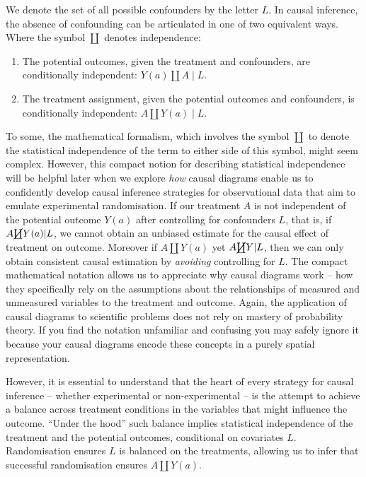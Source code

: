 \documentclass[
  singlecolumn]{article}
\providecommand{\tightlist}{%
  \setlength{\itemsep}{0pt}\setlength{\parskip}{0pt}}\usepackage{longtable,booktabs,array}
\begin{document}
We denote the set of all possible confounders by the letter \(L\). In
causal inference, the absence of confounding can be articulated in one
of two equivalent ways. Where the symbol \(\coprod\) denotes
independence:

\begin{enumerate}
\def\labelenumi{\arabic{enumi}.}
\tightlist
\item
  The potential outcomes, given the treatment and confounders, are
  conditionally independent: \(Y(a) \coprod A \mid L\).
\item
  The treatment assignment, given the potential outcomes and
  confounders, is conditionally independent: \(A \coprod Y(a) \mid L\).
\end{enumerate}

To some, the mathematical formalism, which involves the symbol
\(\coprod\) to denote the statistical independence of the term to either
side of this symbol, might seem complex. However, this compact notion
for describing statistical independence will be helpful later when we
explore \emph{how} causal diagrams enable us to confidently develop
causal inference strategies for observational data that aim to emulate
experimental randomisation. If our treatment \(A\) is not independent of
the potential outcome \(Y(a)\) after controlling for confounders \(L\),
that is, if \(A\cancel\coprod Y(a)|L\), we cannot obtain an unbiased
estimate for the causal effect of treatment on outcome. Moreover if
\(A\coprod Y(a)\) yet \(A\cancel \coprod Y|L\), then we can only obtain
consistent causal estimation by \emph{avoiding} controlling for \(L\).
The compact mathematical notation allows us to appreciate why causal
diagrams work -- how they specifically rely on the assumptions about the
relationships of measured and unmeasured variables to the treatment and
outcome. Again, the application of causal diagrams to scientific
problems does not rely on mastery of probability theory. If you find the
notation unfamiliar and confusing you may safely ignore it because your
causal diagrams encode these concepts in a purely spatial
representation.

However, it is essential to understand that the heart of every strategy
for causal inference -- whether experimental or non-experimental -- is
the attempt to achieve a balance across treatment conditions in the
variables that might influence the outcome. ``Under the hood'' such
balance implies statistical independence of the treatment and the
potential outcomes, conditional on covariates \(L\). Randomisation
ensures \(L\) is balanced on the treatments, allowing us to infer that
successful randomisation ensures \(A \coprod Y(a)\).
\end{document}
